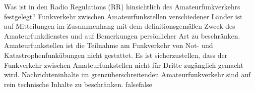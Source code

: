     {Was ist in den Radio Regulations (RR) hinsichtlich des Amateurfunkverkehrs festgelegt?}
    {Funkverkehr zwischen Amateurfunkstellen verschiedener Länder ist auf Mitteilungen im Zusammenhang mit dem definitionsgemäßen Zweck des Amateurfunkdienstes und auf Bemerkungen persönlicher Art zu beschränken.}
    {Amateurfunkstellen ist die Teilnahme am Funkverkehr von Not- und Katastrophenfunkübungen nicht gestattet.}
    {Es ist sicherzustellen, dass der Funkverkehr zwischen Amateurfunkstellen nicht für Dritte zugänglich gemacht wird.}
    {Nachrichteninhalte im grenzüberschreitenden Amateurfunkverkehr sind auf rein technische Inhalte zu beschränken.}
    {false}{false}